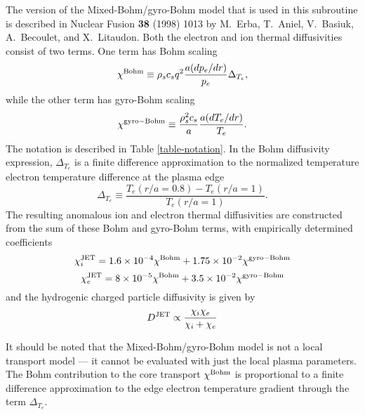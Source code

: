 The version of the Mixed-Bohm/gyro-Bohm
model that is used in this subroutine is described
in Nuclear Fusion {\bf 38} (1998) 1013 by
M.~Erba, T.~Aniel, V.~Basiuk, A.~Becoulet, and X.~Litaudon.
Both the electron and ion thermal diffusivities consist
of two terms.  One term has Bohm scaling
\begin{equation}
\chi^{\rm Bohm} \equiv \rho_s c_s  q^2
\frac{ a ( d p_e / d r ) }{ p_e } \Delta_{T_e},
\label{eq-Bohm}
\end{equation}
while the other term has gyro-Bohm scaling
\begin{equation}
\chi^{\rm gyro-Bohm} \equiv \frac{ \rho_s^2 c_s }{ a }
  \frac{ a ( d T_e / d r ) }{ T_e }.
\label{eq-gyro-Bohm}
\end{equation}
The notation is described in Table \ref{table-notation}.
In the Bohm diffusivity expression, $ \Delta_{T_e} $ is a finite
difference approximation to the normalized temperature electron
temperature difference at the plasma edge
\begin{equation}
\Delta_{T_e} \equiv \frac{T_e(r/a=0.8) - T_e(r/a=1)}{T_e(r/a=1)}.
\label{eq-Delta}
\end{equation}
The resulting anomalous
ion and electron thermal diffusivities are constructed from the
sum of these Bohm and gyro-Bohm terms, with empirically determined
coefficients \cite{erb98}
\begin{equation}
\chi_i^{\rm JET} = 1.6 \times 10^{-4} \chi^{\rm Bohm} +
 1.75 \times 10^{-2} \chi^{\rm gyro-Bohm}
\label{eq-chi-i}
\end{equation}
\begin{equation}
\chi_e^{\rm JET} = 8 \times 10^{-5} \chi^{\rm Bohm} +
 3.5 \times 10^{-2} \chi^{\rm gyro-Bohm}
\label{eq-chi-e}
\end{equation}
and the hydrogenic charged particle diffusivity is given by
\begin{equation}
D^{\rm JET} \propto  \frac{ \chi_i \chi_e }{ \chi_i + \chi_e }
\label{eq-D}
\end{equation}

It should be noted that the Mixed-Bohm/gyro-Bohm model is not a
local transport model --- it cannot be evaluated with just the
local plasma parameters.
The Bohm contribution to the core transport $ \chi^{\rm Bohm} $
is proportional to a finite difference approximation to the edge
electron temperature gradient through the term $ \Delta_{T_e} $.


